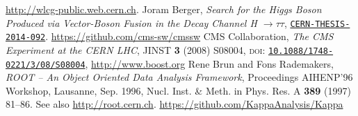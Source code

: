  \begin{thebibliography}{99}
     \url{http://wlcg-public.web.cern.ch}.
    Joram Berger,
      \textit{Search for the Higgs Boson Produced via Vector-Boson
                        Fusion in the Decay Channel H $\to \tau \tau$},
      \href{https://cds.cern.ch/record/1747055}{\texttt{CERN-THESIS-2014-092}}.
     \url{https://github.com/cms-sw/cmssw}
      CMS Collaboration,
      \emph{The CMS Experiment at the CERN LHC},
      JINST \textbf{3} (2008) S08004, 
      \textsc{doi}: \href{http://dx.doi.org/10.1088/1748-0221/3/08/S08004}{\texttt{10.1088/1748-0221/3/08/S08004}},
     \url{http://www.boost.org}
      Rene Brun and Fons Rademakers,
      \emph{ROOT -- An Object Oriented Data Analysis Framework},
      Proceedings AIHENP'96 Workshop, Lausanne, Sep. 1996, Nucl. Inst. \& Meth. in Phys. Res. A \textbf{389} (1997) 81--86. See also \url{http://root.cern.ch}.
     \url{https://github.com/KappaAnalysis/Kappa}
\end{thebibliography}
